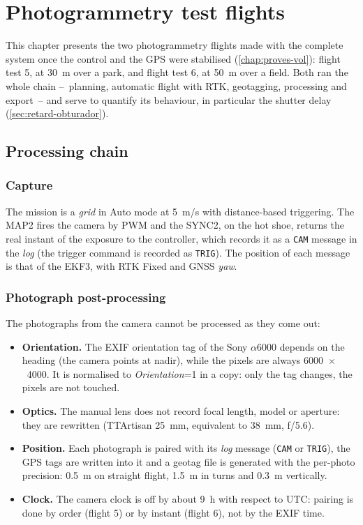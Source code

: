 \chapter{Photogrammetry test flights}
\label{chap:vols-prova}

This chapter presents the two photogrammetry flights made with the complete system once the control and the GPS were stabilised (\cref{chap:proves-vol}): flight test 5, at 30~m over a park, and flight test 6, at 50~m over a field. Both ran the whole chain --~planning, automatic flight with RTK, geotagging, processing and export~-- and serve to quantify its behaviour, in particular the shutter delay (\cref{sec:retard-obturador}).

\section{Processing chain}
\label{sec:cadena-processat}

\subsection{Capture}

The mission is a \emph{grid} in Auto mode at 5~m/s with distance-based triggering. The MAP2 fires the camera by PWM and the SYNC2, on the hot shoe, returns the real instant of the exposure to the controller, which records it as a \texttt{CAM} message in the \emph{log} (the trigger command is recorded as \texttt{TRIG}). The position of each message is that of the EKF3, with RTK Fixed and GNSS \emph{yaw}.

\subsection{Photograph post-processing}
\label{sec:processament-fotos}

The photographs from the camera cannot be processed as they come out:
\begin{itemize}
    \item \textbf{Orientation.} The EXIF orientation tag of the Sony $\alpha$6000 depends on the heading (the camera points at nadir), while the pixels are always 6000~$\times$~4000. It is normalised to \emph{Orientation}=1 in a copy: only the tag changes, the pixels are not touched.
    \item \textbf{Optics.} The manual lens does not record focal length, model or aperture: they are rewritten (TTArtisan 25~mm, equivalent to 38~mm, f/5.6).
    \item \textbf{Position.} Each photograph is paired with its \emph{log} message (\texttt{CAM} or \texttt{TRIG}), the GPS tags are written into it and a geotag file is generated with the per-photo precision: 0.5~m on straight flight, 1.5~m in turns and 0.3~m vertically.
    \item \textbf{Clock.} The camera clock is off by about 9~h with respect to UTC: pairing is done by order (flight 5) or by instant (flight 6), not by the EXIF time.
\end{itemize}

